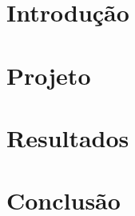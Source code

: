 \documentclass[a4paper,12pt,oneside,openany]{book}
\begin{document}
\frontmatter
\thispagestyle{empty}



\pagebreak            



     \tableofcontents
\listoffigures
\listoftables

\mainmatter
\cleardoublepage
\chapter{Introdução}
\label{intro}

%

\chapter{Projeto}
\label{projeto}

%

\chapter{Resultados}
\label{resultados}

%

\chapter{Conclusão}
\label{conslusao}

%

% 
% 

\backmatter
\end{document}
